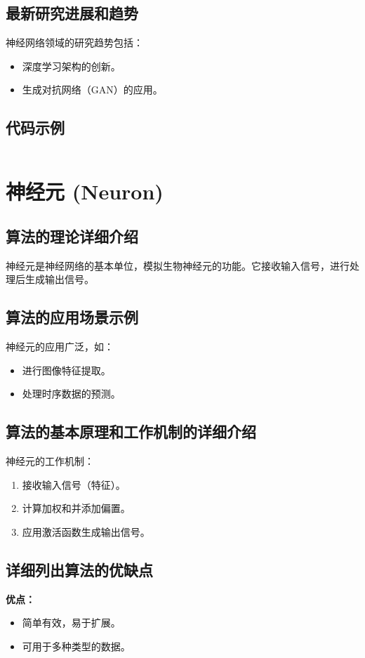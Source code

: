 \subsection*{最新研究进展和趋势}
神经网络领域的研究趋势包括：
\begin{itemize}
    \item 深度学习架构的创新。
    \item 生成对抗网络（GAN）的应用。
\end{itemize}
\subsection*{代码示例}
\begin{lstlisting}

\end{lstlisting}


\section{神经元 (Neuron)}
\subsection*{算法的理论详细介绍}
神经元是神经网络的基本单位，模拟生物神经元的功能。它接收输入信号，进行处理后生成输出信号。

\subsection*{算法的应用场景示例}
神经元的应用广泛，如：
\begin{itemize}
    \item 进行图像特征提取。
    \item 处理时序数据的预测。
\end{itemize}

\subsection*{算法的基本原理和工作机制的详细介绍}
神经元的工作机制：
\begin{enumerate}
    \item 接收输入信号（特征）。
    \item 计算加权和并添加偏置。
    \item 应用激活函数生成输出信号。
\end{enumerate}

\subsection*{详细列出算法的优缺点}
\textbf{优点：}
\begin{itemize}
    \item 简单有效，易于扩展。
    \item 可用于多种类型的数据。
\end{itemize}

